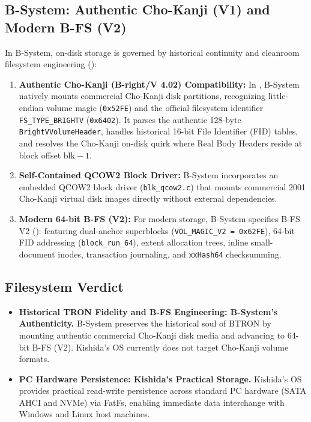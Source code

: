 \documentclass[10pt,journal,compsoc,twocolumn]{article}
\begin{document}
\subsection{B-System: Authentic Cho-Kanji (V1) and Modern B-FS (V2)}
In B-System, on-disk storage is governed by historical continuity and cleanroom filesystem engineering ():
\begin{enumerate}[leftmargin=*]
    \item \textbf{Authentic Cho-Kanji (B-right/V 4.02) Compatibility:} In , B-System natively mounts commercial Cho-Kanji disk partitions, recognizing little-endian volume magic (\texttt{0x52FE}) and the official filesystem identifier \texttt{FS\_TYPE\_BRIGHTV} (\texttt{0x6402}). It parses the authentic 128-byte \texttt{BrightVVolumeHeader}, handles historical 16-bit File Identifier (FID) tables, and resolves the Cho-Kanji on-disk quirk where Real Body Headers reside at block offset $\text{blk} - 1$.
    \item \textbf{Self-Contained QCOW2 Block Driver:} B-System incorporates an embedded QCOW2 block driver (\texttt{blk\_qcow2.c}) that mounts commercial 2001 Cho-Kanji virtual disk images directly without external dependencies.
    \item \textbf{Modern 64-bit B-FS (V2):} For modern storage, B-System specifies B-FS V2 (): featuring dual-anchor superblocks (\texttt{VOL\_MAGIC\_V2 = 0x62FE}), 64-bit FID addressing (\texttt{block\_run\_64}), extent allocation trees, inline small-document inodes, transaction journaling, and \texttt{xxHash64} checksumming.
\end{enumerate}

\subsection{Filesystem Verdict}
\begin{itemize}[leftmargin=*]
    \item \textbf{Historical TRON Fidelity and B-FS Engineering: B-System's Authenticity.} B-System preserves the historical soul of BTRON by mounting authentic commercial Cho-Kanji disk media and advancing to 64-bit B-FS (V2). Kishida's OS currently does not target Cho-Kanji volume formats.
    \item \textbf{PC Hardware Persistence: Kishida's Practical Storage.} Kishida's OS provides practical read-write persistence across standard PC hardware (SATA AHCI and NVMe) via FatFs, enabling immediate data interchange with Windows and Linux host machines.
\end{itemize}
\end{document}
